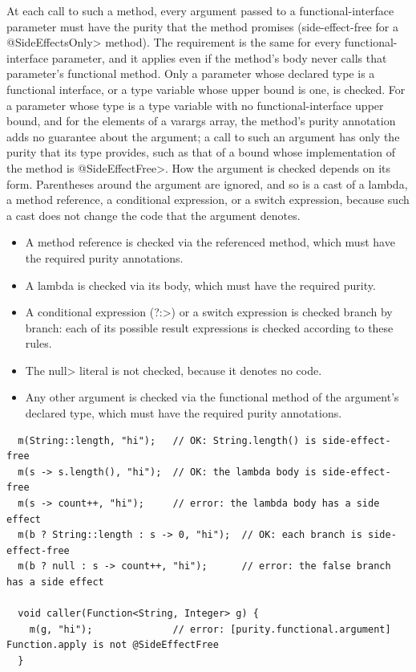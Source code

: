 At each call to such a method, every argument passed to a functional-interface
parameter must have the purity that the method promises (side-effect-free for
a \<@SideEffectsOnly> method).  The requirement is the same for every
functional-interface parameter, and it applies even if the method's body never
calls that parameter's functional method.  Only a parameter whose declared
type is a functional interface, or a type variable whose upper bound is one,
is checked.  For a parameter whose type is a type variable with no
functional-interface upper bound, and for the elements of a varargs array, the
method's purity annotation adds no guarantee about the argument; a call to such
an argument has only the purity that its type provides, such as that of a bound
whose implementation of the method is \<@SideEffectFree>.  How the argument is
checked depends on its form.
Parentheses around the argument are ignored, and so is a cast of a lambda, a
method reference, a conditional expression, or a switch expression, because
such a cast does not change the code that the argument denotes.

\begin{itemize}
\item
  A method reference is checked via the referenced method, which must have
  the required purity annotations.
\item
  A lambda is checked via its body, which must have the required purity.
\item
  A conditional expression (\<?:>) or a switch expression is checked branch
  by branch:  each of its possible result expressions is checked according
  to these rules.
\item
  The \<null> literal is not checked, because it denotes no code.
\item
  Any other argument is checked via the functional method of the argument's
  declared type, which must have the required purity annotations.
\end{itemize}

\begin{Verbatim}
  m(String::length, "hi");   // OK: String.length() is side-effect-free
  m(s -> s.length(), "hi");  // OK: the lambda body is side-effect-free
  m(s -> count++, "hi");     // error: the lambda body has a side effect
  m(b ? String::length : s -> 0, "hi");  // OK: each branch is side-effect-free
  m(b ? null : s -> count++, "hi");      // error: the false branch has a side effect

  void caller(Function<String, Integer> g) {
    m(g, "hi");              // error: [purity.functional.argument] Function.apply is not @SideEffectFree
  }
\end{Verbatim}

